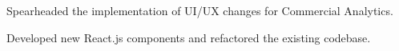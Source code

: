 \documentclass[]{deedy-resume-openfont}
\begin{document}
\begin{minipage}[t]{0.66\textwidth}
\begin{tightemize}
\item Spearheaded the implementation of UI/UX changes for Commercial Analytics.
\item Developed new React.js components and refactored the existing codebase.
\end{tightemize}
\sectionsep








\end{minipage}
\end{document}

